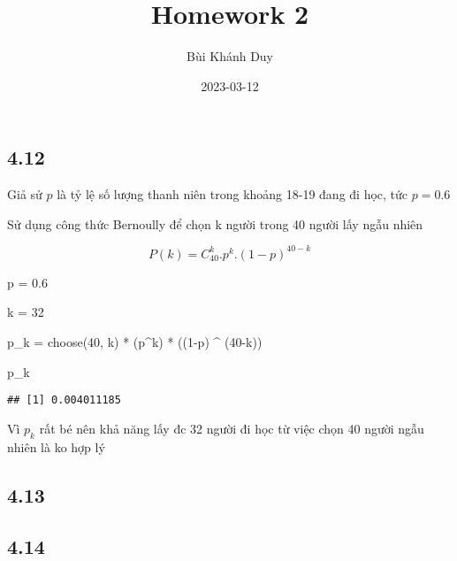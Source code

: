\documentclass[
]{article}
\title{Homework 2}
\author{Bùi Khánh Duy}
\date{2023-03-12}
\newenvironment{Shaded}{\begin{snugshade}}{\end{snugshade}}
\newcommand{\DecValTok}[1]{\textcolor[rgb]{0.00,0.00,0.81}{#1}}
\newcommand{\FloatTok}[1]{\textcolor[rgb]{0.00,0.00,0.81}{#1}}
\newcommand{\FunctionTok}[1]{\textcolor[rgb]{0.00,0.00,0.00}{#1}}
\newcommand{\NormalTok}[1]{#1}
\newcommand{\OtherTok}[1]{\textcolor[rgb]{0.56,0.35,0.01}{#1}}
\newcommand{\SpecialCharTok}[1]{\textcolor[rgb]{0.00,0.00,0.00}{#1}}
\begin{document}
\maketitle

\hypertarget{section}{%
\subsection{4.12}\label{section}}

Giả sử \(p\) là tỷ lệ số lượng thanh niên trong khoảng 18-19 đang đi
học, tức \(p=0.6\)

Sử dụng công thức Bernoully để chọn k người trong 40 người lấy ngẫu
nhiên

\[
P(k) = C^k_{40}.p^k.(1-p)^{40-k}
\]

\begin{Shaded}
\begin{Highlighting}[]
\NormalTok{p }\OtherTok{=} \FloatTok{0.6}

\NormalTok{k }\OtherTok{=} \DecValTok{32}

\NormalTok{p\_k }\OtherTok{=} \FunctionTok{choose}\NormalTok{(}\DecValTok{40}\NormalTok{, k) }\SpecialCharTok{*}\NormalTok{ (p}\SpecialCharTok{\^{}}\NormalTok{k) }\SpecialCharTok{*}\NormalTok{ ((}\DecValTok{1}\SpecialCharTok{{-}}\NormalTok{p) }\SpecialCharTok{\^{}}\NormalTok{ (}\DecValTok{40}\SpecialCharTok{{-}}\NormalTok{k))}

\NormalTok{p\_k}
\end{Highlighting}
\end{Shaded}

\begin{verbatim}
## [1] 0.004011185
\end{verbatim}

Vì \(p_k\) rất bé nên khả năng lấy đc 32 người đi học từ việc chọn 40
người ngẫu nhiên là ko hợp lý

\hypertarget{section-1}{%
\subsection{4.13}\label{section-1}}

\hypertarget{section-2}{%
\subsection{4.14}\label{section-2}}
\end{document}
